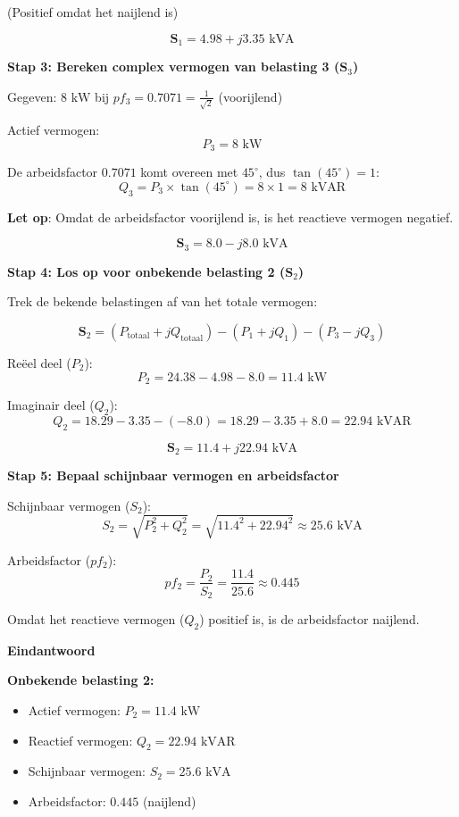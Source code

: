 \documentclass[a4paper,11pt]{article}
\begin{document}
\begin{oefenblok}
(Positief omdat het naijlend is)

$$\mathbf{S}_1 = 4.98 + j3.35 \text{ kVA}$$

\textbf{Stap 3: Bereken complex vermogen van belasting 3 ($\mathbf{S}_3$)}

Gegeven: $8 \text{ kW}$ bij $pf_3 = 0.7071 = \frac{1}{\sqrt{2}}$ (voorijlend)

Actief vermogen:
$$P_3 = 8 \text{ kW}$$

De arbeidsfactor $0.7071$ komt overeen met $45^\circ$, dus $\tan(45^\circ) = 1$:
$$Q_3 = P_3 \times \tan(45^\circ) = 8 \times 1 = 8 \text{ kVAR}$$

\textbf{Let op}: Omdat de arbeidsfactor voorijlend is, is het reactieve vermogen negatief.

$$\mathbf{S}_3 = 8.0 - j8.0 \text{ kVA}$$

\textbf{Stap 4: Los op voor onbekende belasting 2 ($\mathbf{S}_2$)}

Trek de bekende belastingen af van het totale vermogen:

$$\mathbf{S}_2 = (P_{\text{totaal}} + jQ_{\text{totaal}}) - (P_1 + jQ_1) - (P_3 - jQ_3)$$

Reëel deel ($P_2$):
$$P_2 = 24.38 - 4.98 - 8.0 = 11.4 \text{ kW}$$

Imaginair deel ($Q_2$):
$$Q_2 = 18.29 - 3.35 - (-8.0) = 18.29 - 3.35 + 8.0 = 22.94 \text{ kVAR}$$

$$\mathbf{S}_2 = 11.4 + j22.94 \text{ kVA}$$

\textbf{Stap 5: Bepaal schijnbaar vermogen en arbeidsfactor}

Schijnbaar vermogen ($S_2$):
$$S_2 = \sqrt{P_2^2 + Q_2^2} = \sqrt{11.4^2 + 22.94^2} \approx 25.6 \text{ kVA}$$

Arbeidsfactor ($pf_2$):
$$pf_2 = \frac{P_2}{S_2} = \frac{11.4}{25.6} \approx 0.445$$

Omdat het reactieve vermogen ($Q_2$) positief is, is de arbeidsfactor naijlend.

\textbf{Eindantwoord}

\textbf{Onbekende belasting 2:}
\begin{itemize}
    \item Actief vermogen: $P_2 = 11.4 \text{ kW}$
    \item Reactief vermogen: $Q_2 = 22.94 \text{ kVAR}$
    \item Schijnbaar vermogen: $S_2 = 25.6 \text{ kVA}$
    \item Arbeidsfactor: $0.445$ (naijlend)
\end{itemize}

\end{oefenblok}
\end{document}
